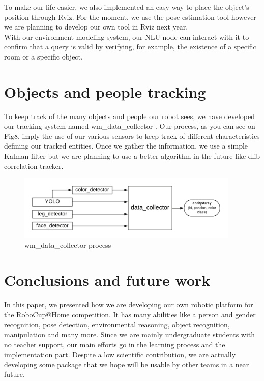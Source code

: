 \documentclass[runningheads,a4paper]{llncs}
\begin{document}
To make our life easier, we also implemented an easy way to place the object's position through Rviz. For the moment, we use the pose estimation tool however we are planning to develop our own tool in Rviz next year.\\

With our environment modeling system, our NLU node can interact with it to confirm that a query is valid by verifying, for example, the existence of a specific room or a specific object.  \\

\section{Objects and people tracking}

\tab To keep track of the many objects and people our robot sees, we have developed our tracking system named wm\_data\_collector \cite{wm_data_collector}. Our process, as you can see on Fig8, imply the use of our various sensors to keep track of different characteristics defining our tracked entities. Once we gather the information, we use a simple Kalman filter but we are planning to use a better algorithm in the future like dlib correlation tracker. \\

\begin{figure}
  \centering
  \includegraphics[width=300pt]{images/wm_data_collector.png}
  \caption{ wm\_data\_collector process}
\end{figure} 


\section{Conclusions and future work} 
\tab In this paper, we presented how we are developing our own robotic platform for the RoboCup@Home competition. It has many abilities like a person and gender recognition, pose detection, environmental reasoning, object recognition, manipulation and many more. Since we are mainly undergraduate students with no teacher support, our main efforts go in the learning process and the implementation part. Despite a low scientific contribution, we are actually developing some package that we hope will be usable by other teams in a near future.\\
\end{document}
